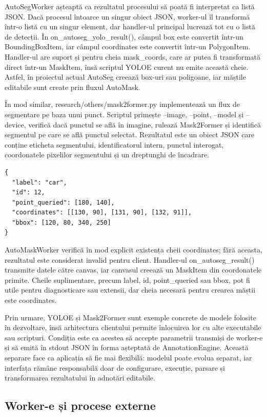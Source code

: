 AutoSegWorker așteaptă ca rezultatul procesului să poată fi interpretat ca listă JSON. Dacă procesul întoarce un singur obiect JSON, worker-ul îl transformă într-o listă cu un singur element, dar handler-ul principal lucrează tot cu o listă de detecții. În on\_autoseg\_yolo\_result(), câmpul box este convertit într-un BoundingBoxItem, iar câmpul coordinates este convertit într-un PolygonItem. Handler-ul are suport și pentru cheia mask\_coords, care ar putea fi transformată direct într-un MaskItem, însă scriptul YOLOE curent nu emite această cheie. Astfel, în proiectul actual AutoSeg creează box-uri sau poligoane, iar măștile editabile sunt create prin fluxul AutoMask.

În mod similar, research/others/mask2former.py implementează un flux de segmentare pe baza unui punct. Scriptul primește --image, --point, --model și --device, verifică dacă punctul se află în imagine, rulează Mask2Former și identifică segmentul pe care se află punctul selectat. Rezultatul este un obiect JSON care conține eticheta segmentului, identificatorul intern, punctul interogat, coordonatele pixelilor segmentului și un dreptunghi de încadrare.

\begin{verbatim}
{
  "label": "car",
  "id": 12,
  "point_queried": [180, 140],
  "coordinates": [[130, 90], [131, 90], [132, 91]],
  "bbox": [120, 80, 340, 250]
}
\end{verbatim}

AutoMaskWorker verifică în mod explicit existența cheii coordinates; fără aceasta, rezultatul este considerat invalid pentru client. Handler-ul on\_autoseg\_result() transmite datele către canvas, iar canvasul creează un MaskItem din coordonatele primite. Cheile suplimentare, precum label, id, point\_queried sau bbox, pot fi utile pentru diagnosticare sau extensii, dar cheia necesară pentru crearea măștii este coordinates.

Prin urmare, YOLOE și Mask2Former sunt exemple concrete de modele folosite în dezvoltare, însă arhitectura clientului permite înlocuirea lor cu alte executabile sau scripturi. Condiția este ca acestea să accepte parametrii transmiși de worker-e și să emită în stdout JSON în forma așteptată de AnnotationEngine. Această separare face ca aplicația să fie mai flexibilă: modelul poate evolua separat, iar interfața rămâne responsabilă doar de configurare, execuție, parsare și transformarea rezultatului în adnotări editabile.

\subsection{Worker-e și procese externe}

